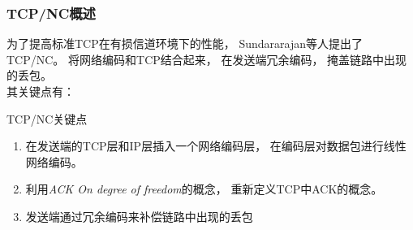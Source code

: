 \begin{frame}[t]
	\frametitle{TCP/NC概述}
	为了提高标准TCP在有损信道环境下的性能，
	Sundararajan等人提出了TCP/NC。
	将网络编码和TCP结合起来，
	在发送端冗余编码，
	掩盖链路中出现的丢包。
	\\
	其关键点有：
	\begin{block}{TCP/NC关键点}
		\begin{enumerate}
			\item 在发送端的TCP层和IP层插入一个网络编码层，
			在编码层对数据包进行线性网络编码。
			\item 利用\emph{ACK On degree of freedom}的概念，
			重新定义TCP中ACK的概念。
			\item 发送端通过冗余编码来补偿链路中出现的丢包
		\end{enumerate}
	\end{block}
\end{frame}

